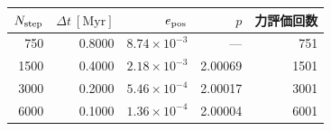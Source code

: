 \begin{tabular}{rrrrr}\toprule
$N_{\rm step}$ & $\Delta t\ [\mathrm{Myr}]$ & $e_{\rm pos}$ & $p$ & 力評価回数 \\
\midrule
750 & 0.8000 & $8.74\times 10^{-3}$ & --- & 751 \\
1500 & 0.4000 & $2.18\times 10^{-3}$ & 2.00069 & 1501 \\
3000 & 0.2000 & $5.46\times 10^{-4}$ & 2.00017 & 3001 \\
6000 & 0.1000 & $1.36\times 10^{-4}$ & 2.00004 & 6001 \\
\bottomrule\end{tabular}
